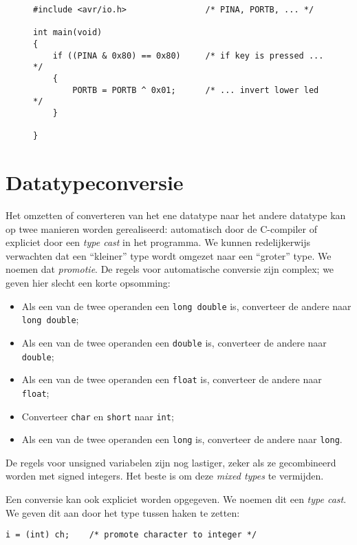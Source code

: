 \begin{figure}[!ht]
\begin{lstlisting}[caption=Gebruik van bitsgewijze operatoren.]
#include <avr/io.h>                /* PINA, PORTB, ... */

int main(void)
{
    if ((PINA & 0x80) == 0x80)     /* if key is pressed ... */
    {
        PORTB = PORTB ^ 0x01;      /* ... invert lower led */
    }

}
\end{lstlisting}
\end{figure}


\section{Datatypeconversie}
Het omzetten of converteren van het ene datatype naar het andere datatype kan op twee manieren worden gerealiseerd: automatisch door de C-compiler of expliciet door een \textsl{type cast} in het programma. We kunnen redelijkerwijs verwachten dat een ``kleiner'' type wordt omgezet naar een ``groter'' type. We noemen dat \textsl{promotie}. De regels voor automatische conversie zijn complex; we geven hier slecht een korte opsomming:

\begin{itemize}
\item Als een van de twee operanden een \texttt{long double} is, converteer de andere naar \texttt{long double};
\item Als een van de twee operanden een \texttt{double} is, converteer de andere naar \texttt{double};
\item Als een van de twee operanden een \texttt{float} is, converteer de andere naar \texttt{float};
\item Converteer \texttt{char} en \texttt{short} naar \texttt{int};
\item Als een van de twee operanden een \texttt{long} is, converteer de andere naar \texttt{long}.
\end{itemize}

De regels voor unsigned variabelen zijn nog lastiger, zeker als ze gecombineerd worden met signed integers. Het beste is om deze \textsl{mixed types} te vermijden.

Een conversie kan ook expliciet worden opgegeven. We noemen dit een \textsl{type cast}. We geven dit aan door het type tussen haken te zetten:

\hspace*{1em}\texttt{i = (int) ch; \ \ \  /* promote character to integer */}

